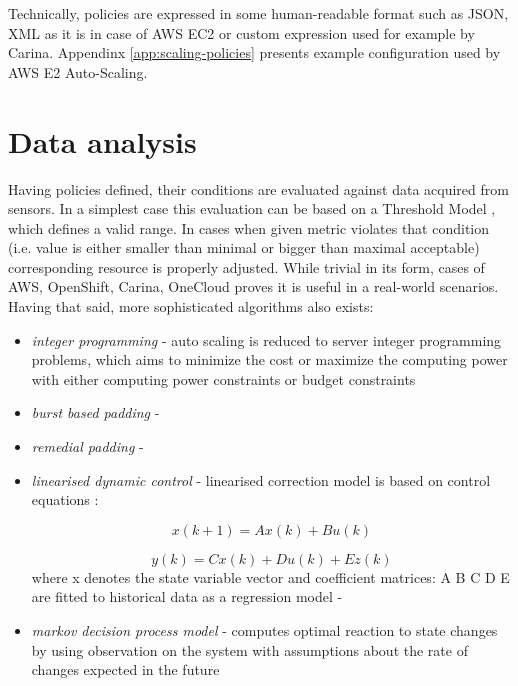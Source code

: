 Technically, policies are expressed in some human-readable format such as JSON, XML as it is in case of AWS EC2 or custom expression used for example by Carina. Appendinx \ref{app:scaling-policies} presents example configuration used by AWS E2 Auto-Scaling.

\section{Data analysis}
Having policies defined, their conditions are evaluated against data acquired from sensors. In a simplest case this evaluation can be based on a Threshold Model \cite{LiWoZh05}, which defines a valid range. In cases when given metric violates that condition (i.e. value is either smaller than minimal or bigger than maximal acceptable) corresponding resource is properly adjusted. While trivial in its form, cases of AWS, OpenShift, Carina, OneCloud proves it is useful in a real-world scenarios. Having that said, more sophisticated algorithms also exists:
\begin{itemize}
  \item \textit{integer programming} - auto scaling is reduced to server integer programming problems, which aims to minimize the cost or maximize the computing power with either computing power constraints or
budget constraints \cite{MaLiHu10}
  \item \textit{burst based padding} -  \cite{ShSuGuWi11}
  \item \textit{remedial padding} - \cite{ShSuGuWi11}
  \item \textit{linearised dynamic control} - linearised correction model is based on control equations \cite{AbShBh02}:
  
    \begin{equation}
      x(k+1)=Ax(k)+Bu(k)
    \end{equation}
    
    \begin{equation}
       y(k) = C x(k) + D u(k) + E z(k)
    \end{equation}
    where x denotes the state variable vector and coefficient matrices: A B C D E are fitted to historical data as a regression model - \cite{DiLuFrHePa03}

  \item \textit{markov decision process model} - computes optimal reaction to state changes by using observation on the system with assumptions about the rate of changes expected in the future \cite{AbWo02}
\end{itemize}

